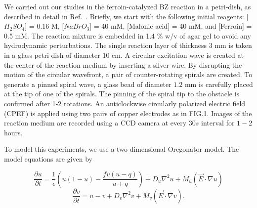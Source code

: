 
We carried out our studies in the ferroin-catalyzed BZ reaction in a petri-dish, as described in detail in Ref.~\cite{Amrutha}. Briefly, we start with the following initial reagents: [$H_2SO_4$] = 0.16 M, [$NaBrO_3$] = 40 mM, [Malonic acid] = 40 mM, and [Ferroin] = 0.5 mM. The reaction mixture is embedded in 1.4 $\%$ w/v of agar gel to avoid any hydrodynamic perturbations. The single reaction layer of thickness $3$ mm is taken in a glass petri dish of diameter $10$ cm. 
A circular excitation wave is created at the center of the reaction medium by inserting a silver wire. By disrupting the motion of the circular wavefront, a pair of counter-rotating spirals are created. To generate a pinned spiral wave, a glass bead of diameter $1.2$ mm is carefully placed at the tip of one of the spirals. The pinning of the spiral tip to the obstacle is confirmed after 1-2 rotations. An anticlockwise circularly polarized electric field (CPEF) is applied using two pairs of copper electrodes as in FIG.1. Images of the reaction medium are recorded using a CCD camera at every $30 s$ interval for $1-2$ hours.%

To model this experiments, we use a two-dimensional Oregonator model. The model equations are given by 

\begin{equation}\label{E_uoregonator}
\frac{\partial u}{\partial t}=\frac{1}{\epsilon}(u(1-u)-\frac{fv(u-q)}{u+q})
+D_{u}\nabla^2u+M_{u}(\vec{E} \cdot \nabla u)
\end{equation}
\begin{equation}\label{E_voregonator}
\frac{\partial v}{\partial t}=u-v+D_{v}\nabla^2v+M_{v}(\vec{E} \cdot \nabla v).
\end{equation}

